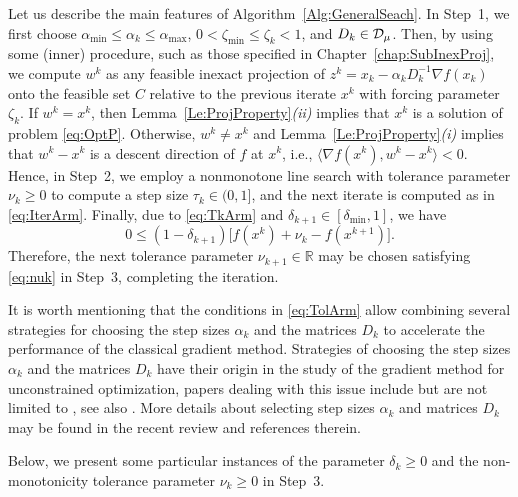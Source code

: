 Let us describe the main features of Algorithm~\ref{Alg:GeneralSeach}. In Step~1,  we first  choose   $\alpha_{\min}\leq \alpha_k \leq \alpha_{\max}$, $0 < \zeta_{\min} \leq \zeta_k  < 1$, and  $D_k\in  {\cal D}_{\mu}$. Then, by using some (inner) procedure, such as those specified in Chapter~\ref{chap:SubInexProj}, we compute $w^k$ as any feasible inexact projection of $z^k = x_k - \alpha_kD_k^{-1}\nabla f(x_k)$ onto the feasible set $C$ relative to the previous iterate $x^k$ with forcing parameter $\zeta_k$. If $w^k= x^k$, then Lemma~\ref{Le:ProjProperty}{\it (ii)} implies that $x^{k}$ is a solution of  problem \eqref{eq:OptP}.  Otherwise,  $w^k\neq  x^k$ and Lemma~\ref{Le:ProjProperty}{\it (i)}  implies  that $ w^k- x^k$ is a descent direction of $f$ at $x^k$, i.e.,  $\langle \nabla f(x^k), w^k- x^k \rangle < 0$.    Hence, in Step~2, we employ a nonmonotone line search  with tolerance parameter $\nu_k\geq 0$ to compute a step size  $\tau_k \in (0, 1]$,  and  the next iterate is computed as in \eqref{eq:IterArm}. Finally, due to  \eqref{eq:TkArm} and  $\delta_{k+1}\in [\delta_{\min}, 1]$, we have $$0\leq (1-\delta_{k+1})\big[f(x^{k})+\nu_{k}-  f(x^{k+1})\big].$$  Therefore, the next   tolerance parameter $\nu_{k+1}\in {\mathbb R}$ may be chosen satisfying \eqref{eq:nuk}  in Step~3, completing the iteration.

It is worth mentioning that the conditions in \eqref{eq:TolArm}  allow combining several strategies for choosing the step sizes $\alpha_k$  and the matrices $D_k$  to accelerate the performance of the classical gradient method.   Strategies  of choosing the step sizes $\alpha_k$  and the matrices $D_k$ have their origin in the study of the gradient  method  for unconstrained  optimization,  papers dealing with this issue include  but are not limited to \cite{BB1988, DaiHage2006, Serafino2018, Friedlander1999, Dai2006}, see also  \cite{BonettiniPrato2015, DaiFletcher2005, DaiFletcher2006, Polyak_Levitin1966}. More details  about   selecting  step sizes $\alpha_k$  and matrices $D_k$  may be found in the recent  review  \cite{bonettini2019recent} and  references therein.


Below, we present some  particular instances  of the parameter   $\delta_k\geq 0$ and  the non-monotonicity tolerance parameter $ \nu_ {k} \geq 0$  in Step~3.

